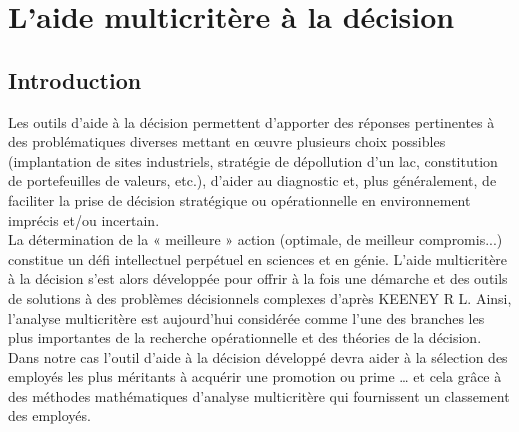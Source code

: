 \chapter{L’aide multicritère à la décision }

\section{Introduction}

Les outils d'aide à la décision permettent d'apporter des réponses pertinentes à des problématiques diverses mettant en œuvre plusieurs choix possibles (implantation de sites industriels, stratégie de dépollution d'un lac, constitution de portefeuilles de valeurs, etc.), d'aider au diagnostic et, plus généralement, de faciliter la prise de décision stratégique ou opérationnelle en environnement imprécis et/ou incertain.\\
La détermination de la « meilleure » action (optimale, de meilleur compromis...) constitue un défi intellectuel perpétuel en sciences et en génie. L’aide multicritère à la décision s’est alors développée pour offrir à la fois une démarche et des outils de solutions à des problèmes décisionnels complexes d’après KEENEY R L. Ainsi, l’analyse multicritère est aujourd’hui considérée comme l’une des branches les plus importantes de la recherche opérationnelle et des théories de la décision.\\
Dans notre cas l’outil d’aide à la décision développé devra aider à la sélection des employés les plus méritants à acquérir une promotion ou prime …  et cela grâce à des méthodes mathématiques d'analyse multicritère qui fournissent un classement des employés.

